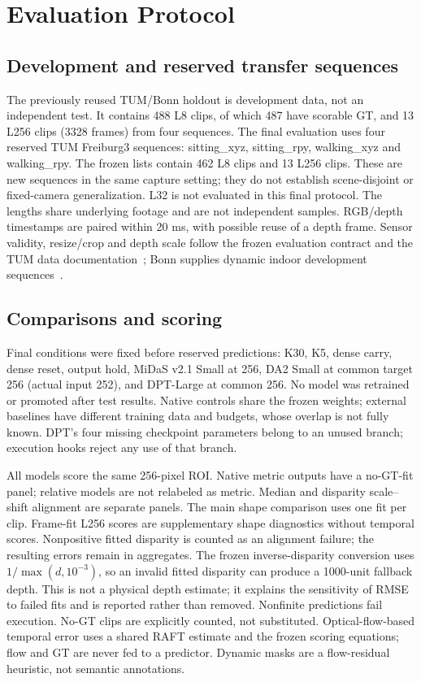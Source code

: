 \documentclass[mathematics,article,submit,moreauthors]{Definitions/mdpi}
\begin{document}
\section{Evaluation Protocol}
\subsection{Development and reserved transfer sequences}
The previously reused TUM/Bonn holdout is development data, not an independent test.
It contains 488 L8 clips, of which 487 have scorable GT, and 13 L256 clips (3328 frames)
from four sequences. The final evaluation uses four reserved TUM Freiburg3 sequences:
sitting\_xyz, sitting\_rpy, walking\_xyz and walking\_rpy. The frozen lists contain
462 L8 clips and 13 L256 clips. These are new sequences in the same capture setting;
they do not establish scene-disjoint or fixed-camera generalization. L32 is not evaluated
in this final protocol. The lengths share underlying footage and are not independent samples.
RGB/depth timestamps are paired within 20 ms, with possible reuse of a depth frame.
Sensor validity, resize/crop and depth scale follow the frozen evaluation contract and
the TUM data documentation~\cite{tumdata}; Bonn supplies dynamic indoor development
sequences~\cite{bonndata}.

\subsection{Comparisons and scoring}
Final conditions were fixed before reserved predictions: K30, K5, dense carry, dense reset,
output hold, MiDaS v2.1 Small at 256, DA2 Small at common target 256 (actual input 252),
and DPT-Large at common 256. No model was retrained or promoted after test results.
Native controls share the frozen weights; external baselines have different training
data and budgets, whose overlap is not fully known. DPT's four missing checkpoint
parameters belong to an unused branch; execution hooks reject any use of that branch.

All models score the same 256-pixel ROI. Native metric outputs have a no-GT-fit panel;
relative models are not relabeled as metric. Median and disparity scale--shift alignment
are separate panels. The main shape comparison uses one fit per clip. Frame-fit L256
scores are supplementary shape diagnostics without temporal scores. Nonpositive fitted
disparity is counted as an alignment failure; the resulting errors remain in aggregates.
The frozen inverse-disparity conversion uses $1/\max(d,10^{-3})$, so an invalid
fitted disparity can produce a 1000-unit fallback depth. This is not a physical depth
estimate; it explains the sensitivity of RMSE to failed fits and is reported rather than removed.
Nonfinite predictions fail execution. No-GT clips are explicitly counted, not substituted.
Optical-flow-based temporal error uses a shared RAFT estimate and the frozen scoring
equations; flow and GT are never fed to a predictor. Dynamic masks are a flow-residual
heuristic, not semantic annotations.
\end{document}
